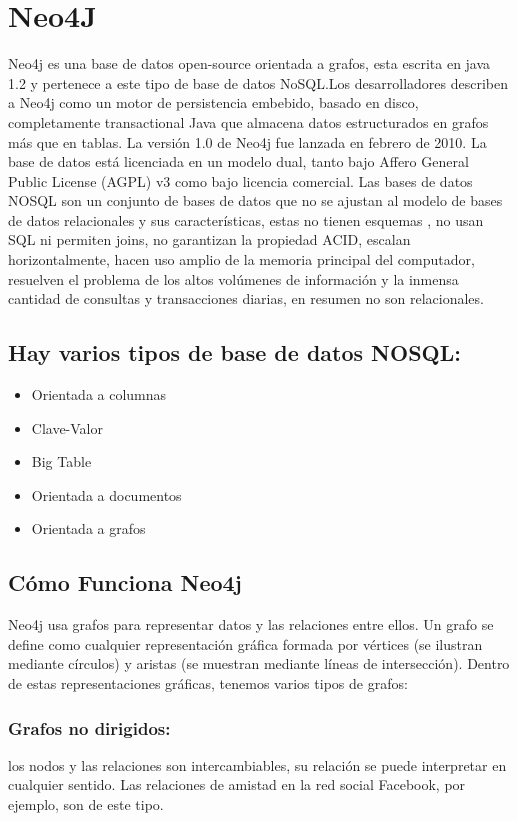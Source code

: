 \section{Neo4J}
Neo4j es una base de datos open-source orientada a grafos, esta escrita en java 1.2 y pertenece a este tipo de base de datos NoSQL.Los desarrolladores describen a Neo4j como un motor de persistencia embebido, basado en disco, completamente transactional Java que almacena datos estructurados en grafos más que en tablas. La versión 1.0 de Neo4j fue lanzada en febrero de 2010. La base de datos está licenciada en un modelo dual, tanto bajo Affero General Public License (AGPL) v3 como bajo licencia comercial.
Las bases de datos NOSQL son un conjunto de bases de datos que no se ajustan al modelo de bases de datos relacionales y sus características, estas no tienen esquemas  , no usan SQL ni permiten joins, no garantizan la propiedad ACID,  escalan horizontalmente, hacen uso amplio de la memoria principal del computador, resuelven el problema de los altos volúmenes de información y la inmensa cantidad de consultas y transacciones diarias, en resumen no son relacionales. \cite{16}
\subsection{Hay varios tipos de base de datos NOSQL: \cite{17}}
\begin{itemize}
	\item Orientada a columnas
	\item Clave-Valor
	\item Big Table
	\item Orientada a documentos
	\item Orientada a grafos
\end{itemize}
\subsection{Cómo Funciona Neo4j}
Neo4j usa grafos para representar datos y las relaciones entre ellos. Un grafo se define como cualquier representación gráfica formada por vértices (se ilustran mediante círculos) y aristas (se muestran mediante líneas de intersección). Dentro de estas representaciones gráficas, tenemos varios tipos de grafos:\cite{18}
\subsubsection{ Grafos no dirigidos:}
	 los nodos y las relaciones son intercambiables, su relación se puede interpretar en cualquier sentido. 	Las relaciones de amistad en la red social Facebook, por ejemplo, son de este tipo. 
